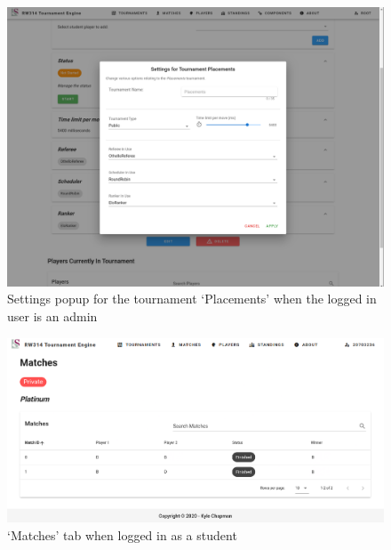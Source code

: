 \documentclass[a4paper, 12pt]{report}
\begin{document}
\begin{figure}[H]
	\centering
	\includegraphics[scale=0.33]{settings-admin.png}
	\caption{Settings popup for the tournament `Placements' when the logged in user is an admin}
	\label{fig:settings-admin}
\end{figure}
\begin{figure}[H]
	\centering
	\includegraphics[scale=0.38]{matches-student.png}
	\caption{`Matches' tab when logged in as a student}
	\label{fig:matches-student}
\end{figure}
\end{document}
